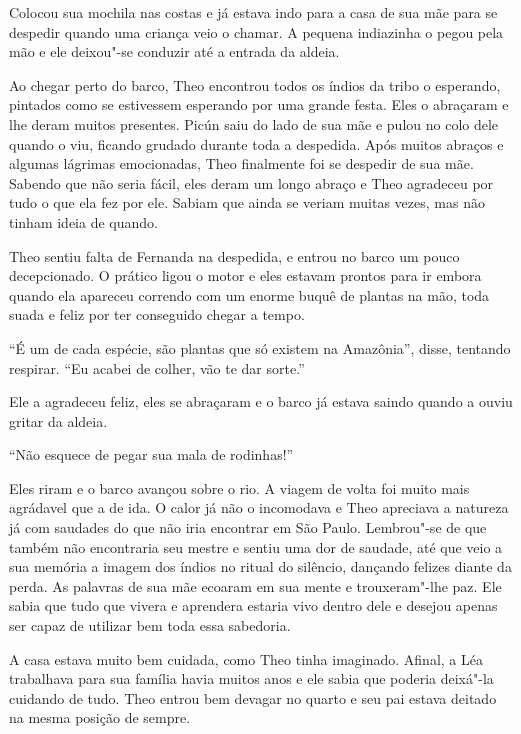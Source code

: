 Colocou sua mochila nas costas e já estava indo para a casa de sua mãe
para se despedir quando uma criança veio o chamar. A pequena indiazinha
o pegou pela mão e ele deixou"-se conduzir até a entrada da aldeia.

Ao chegar perto do barco, Theo encontrou todos os índios da tribo o
esperando, pintados como se estivessem esperando por uma grande festa.
Eles o abraçaram e lhe deram muitos presentes. Picún saiu do lado de sua
mãe e pulou no colo dele quando o viu, ficando grudado durante toda a
despedida. Após muitos abraços e algumas lágrimas emocionadas, Theo
finalmente foi se despedir de sua mãe. Sabendo que não seria fácil, eles
deram um longo abraço e Theo agradeceu por tudo o que ela fez por ele.
Sabiam que ainda se veriam muitas vezes, mas não tinham ideia de
quando.

Theo sentiu falta de Fernanda na despedida, e entrou no barco um pouco
decepcionado. O prático ligou o motor e eles estavam prontos para ir
embora quando ela apareceu correndo com um enorme buquê de plantas na
mão, toda suada e feliz por ter conseguido chegar a tempo.

``É um de cada espécie, são plantas que só existem na Amazônia'', disse,
tentando respirar. ``Eu acabei de colher, vão te dar sorte.''

Ele a agradeceu feliz, eles se abraçaram e o barco já estava saindo
quando a ouviu gritar da aldeia.

``Não esquece de pegar sua mala de rodinhas!''

Eles riram e o barco avançou sobre o rio. A viagem de volta foi muito
mais agrádavel que a de ida. O calor já não o incomodava e Theo
apreciava a natureza já com saudades do que não iria encontrar em São
Paulo. Lembrou"-se de que também não encontraria seu mestre e sentiu uma
dor de saudade, até que veio a sua memória a imagem dos índios no ritual
do silêncio, dançando felizes diante da perda. As palavras de sua mãe
ecoaram em sua mente e trouxeram"-lhe paz. Ele sabia que tudo que
vivera e aprendera estaria vivo dentro dele e desejou apenas ser capaz
de utilizar bem toda essa sabedoria.

\asterisc



A casa estava muito bem cuidada, como Theo tinha imaginado. Afinal, a Léa
trabalhava para sua família havia muitos anos e ele sabia que poderia
deixá"-la cuidando de tudo. Theo entrou bem devagar no quarto e
seu pai estava deitado na mesma posição de sempre.

